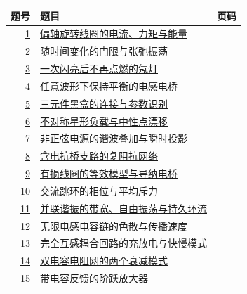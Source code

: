 \documentclass[UTF8,fontset=fandol,a4paper,11pt]{ctexart}
\begin{document}
\begin{longtable}{@{}r p{113mm} r@{}}\toprule 题号 & 题目 & 页码\\\midrule

\hyperref[q:1]{1} & \hyperref[q:1]{偏轴旋转线圈的电流、力矩与能量} & \pageref{q:1} \\

\hyperref[q:2]{2} & \hyperref[q:2]{随时间变化的门限与张弛振荡} & \pageref{q:2} \\

\hyperref[q:3]{3} & \hyperref[q:3]{一次闪亮后不再点燃的氖灯} & \pageref{q:3} \\

\hyperref[q:4]{4} & \hyperref[q:4]{任意波形下保持平衡的电感电桥} & \pageref{q:4} \\

\hyperref[q:5]{5} & \hyperref[q:5]{三元件黑盒的连接与参数识别} & \pageref{q:5} \\

\hyperref[q:6]{6} & \hyperref[q:6]{不对称星形负载与中性点漂移} & \pageref{q:6} \\

\hyperref[q:7]{7} & \hyperref[q:7]{非正弦电源的谐波叠加与瞬时投影} & \pageref{q:7} \\

\hyperref[q:8]{8} & \hyperref[q:8]{含电抗桥支路的复阻抗网络} & \pageref{q:8} \\

\hyperref[q:9]{9} & \hyperref[q:9]{有损线圈的等效模型与导纳电桥} & \pageref{q:9} \\

\hyperref[q:10]{10} & \hyperref[q:10]{交流跳环的相位与平均斥力} & \pageref{q:10} \\

\hyperref[q:11]{11} & \hyperref[q:11]{并联谐振的带宽、自由振荡与持久环流} & \pageref{q:11} \\

\hyperref[q:12]{12} & \hyperref[q:12]{无限电感电容链的色散与传播速度} & \pageref{q:12} \\

\hyperref[q:13]{13} & \hyperref[q:13]{完全互感耦合回路的充放电与快慢模式} & \pageref{q:13} \\

\hyperref[q:14]{14} & \hyperref[q:14]{双电容电阻网的两个衰减模式} & \pageref{q:14} \\

\hyperref[q:15]{15} & \hyperref[q:15]{带电容反馈的阶跃放大器} & \pageref{q:15} \\


\end{longtable}
\end{document}
